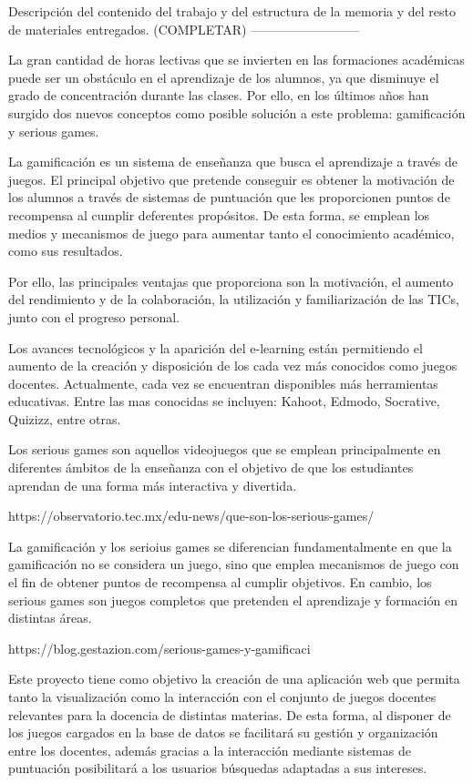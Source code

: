 
Descripción del contenido del trabajo y del estructura de la memoria y del resto de materiales entregados.
(COMPLETAR)
--------------------------

La gran cantidad de horas lectivas que se invierten en las formaciones académicas puede ser un obstáculo en el aprendizaje de los alumnos, ya que disminuye el grado de concentración durante las clases. Por ello, en los últimos años han surgido dos nuevos conceptos como posible solución a este problema: gamificación y serious games.

La gamificación es un sistema de enseñanza que busca el aprendizaje a través de juegos. El principal objetivo que pretende conseguir es obtener la motivación de los alumnos a través de sistemas de puntuación que les proporcionen puntos de recompensa al cumplir deferentes propósitos. De esta forma, se emplean los medios y mecanismos de juego para aumentar tanto el conocimiento académico, como sus resultados. 

Por ello, las principales ventajas que proporciona son la motivación, el aumento del rendimiento y de la colaboración, la utilización y familiarización de las TICs, junto con el progreso personal.

Los avances tecnológicos y la aparición del e-learning están permitiendo el aumento de la creación y disposición de los cada vez más conocidos como juegos docentes. Actualmente, cada vez se encuentran disponibles más herramientas educativas. Entre las mas conocidas se incluyen: Kahoot, Edmodo, Socrative, Quizizz, entre otras.

Los serious games son aquellos videojuegos que se emplean principalmente en diferentes ámbitos de la enseñanza con el objetivo de que los estudiantes aprendan de una forma más interactiva y divertida. 

https://observatorio.tec.mx/edu-news/que-son-los-serious-games/

La gamificación y los serioius games se diferencian fundamentalmente en que la gamificación no se considera un juego, sino que emplea mecanismos de juego con el fin de obtener puntos de recompensa al cumplir objetivos. En cambio, los serious games son juegos completos que pretenden el aprendizaje y formación en distintas áreas.

https://blog.gestazion.com/serious-games-y-gamificaci%

Este proyecto tiene como objetivo la creación de una aplicación web que permita tanto la visualización como la interacción con el conjunto de juegos docentes relevantes para la docencia de distintas materias. De esta forma, al disponer de los juegos cargados en la base de datos se facilitará su gestión y organización entre los docentes, además gracias a la interacción mediante sistemas de puntuación posibilitará a los usuarios búsquedas adaptadas a sus intereses.


